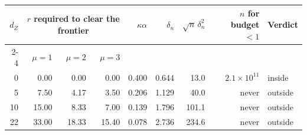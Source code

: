\begin{tabular}{rrrrrrrrl}
\toprule
$d_Z$ & \multicolumn{3}{c}{$r$ required to clear the frontier} & $\kappa\alpha$ & $\delta_n$ & $\sqrt n\,\delta_n^2$ & $n$ for budget $<1$ & Verdict \\
\cmidrule(lr){2-4}
& $\mu=1$ & $\mu=2$ & $\mu=3$ & & & & & \\
\midrule
0 & 0.00 & 0.00 & 0.00 & 0.400 & 0.644 & 13.0 & $2.1\times10^{11}$ & inside \\
5 & 7.50 & 4.17 & 3.50 & 0.206 & 1.129 & 40.0 & never & outside \\
10 & 15.00 & 8.33 & 7.00 & 0.139 & 1.796 & 101.1 & never & outside \\
22 & 33.00 & 18.33 & 15.40 & 0.078 & 2.736 & 234.6 & never & outside \\
\bottomrule
\end{tabular}
